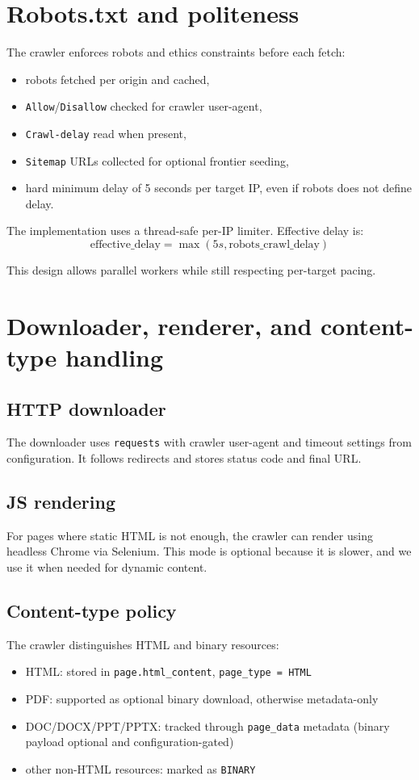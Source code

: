 \documentclass[9pt]{IEEEtran}
\begin{document}
\section{Robots.txt and politeness}
The crawler enforces robots and ethics constraints before each fetch:
\begin{itemize}
    \item robots fetched per origin and cached,
    \item \texttt{Allow}/\texttt{Disallow} checked for crawler user-agent,
    \item \texttt{Crawl-delay} read when present,
    \item \texttt{Sitemap} URLs collected for optional frontier seeding,
    \item hard minimum delay of 5 seconds per target IP, even if robots does not define delay.
\end{itemize}

The implementation uses a thread-safe per-IP limiter. Effective delay is:
\[
    \text{effective\_delay} = \max(5s, \text{robots\_crawl\_delay})
\]

This design allows parallel workers while still respecting per-target pacing.

\section{Downloader, renderer, and content-type handling}
\subsection{HTTP downloader}
The downloader uses \texttt{requests} with crawler user-agent and timeout settings from configuration. It follows redirects and stores status code and final URL.

\subsection{JS rendering}
For pages where static HTML is not enough, the crawler can render using headless Chrome via Selenium. This mode is optional because it is slower, and we use it when needed for dynamic content.

\subsection{Content-type policy}
The crawler distinguishes HTML and binary resources:
\begin{itemize}
    \item HTML: stored in \texttt{page.html\_content}, \texttt{page\_type = HTML}
    \item PDF: supported as optional binary download, otherwise metadata-only
    \item DOC/DOCX/PPT/PPTX: tracked through \texttt{page\_data} metadata (binary payload optional and configuration-gated)
    \item other non-HTML resources: marked as \texttt{BINARY}
\end{itemize}
\end{document}

